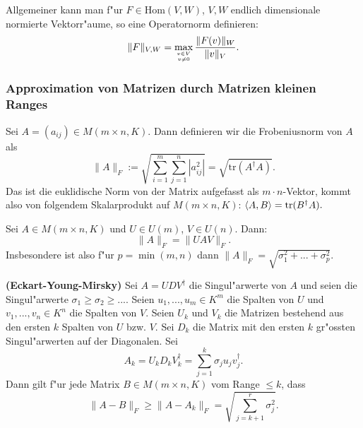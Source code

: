 \documentclass[9pt, a4paper, twocolumn, landscape]{article}
\begin{document}
\begin{remark}
Allgemeiner kann man f"ur $F \in \mathrm{Hom}(V, W)$, $V, W$ endlich dimensionale normierte Vektorr"aume, so eine Operatornorm definieren:
$$
\|F\|_{V, W} = \max\limits_{ v \in V \atop v \neq 0} \frac{\|F(v)\|_W}{\|v\|_V}.
$$
\end{remark}



\subsubsection{Approximation von Matrizen durch Matrizen kleinen Ranges}
\begin{definition}
Sei $A = (a_{ij}) \in M( m \times n, K)$. Dann definieren wir die Frobeniusnorm von $A$ als
$$
\|A\|_F := \sqrt{\sum\limits_{i = 1}^m \sum\limits_{j = 1}^n |a_{ij}^2|} = \sqrt{\mathrm{tr}(A^\dagger A)}.
$$
Das ist die euklidische Norm von der Matrix aufgefasst als $m \cdot n$-Vektor, kommt also von folgendem Skalarprodukt auf $M(m \times n, K)$:
$
\left\langle {A} , {B} \right\rangle = \mathrm{tr}(B^\dagger A).
$
\end{definition}



\begin{lemma}
Sei $A \in M( m \times n, K)$ und $U \in U(m)$, $V \in U(n)$. Dann:
$$
\| A \|_F = \|UAV\|_F.
$$
Insbesondere ist also f"ur $p = \min(m, n)$ dann
$
\|A\|_F =  \sqrt{\sigma_1^2 + ... + \sigma_p^2}.
$
\end{lemma}

\begin{theorem} \textbf{(Eckart-Young-Mirsky)} Sei $A = UDV^\dagger$ die Singul"arwerte von $A$ und seien die Singul"arwerte $\sigma_1 \geq  \sigma_2 \geq...$. Seien $u_1, ..., u_m \in K^m$ die Spalten von $U$ und $v_1, ..., v_n \in K^n$ die Spalten von $V$. Seien $U_k$ und $V_k$ die Matrizen bestehend aus den ersten $k$ Spalten von $U$ bzw. $V$. Sei $D_k$ die Matrix mit den ersten $k$ gr"ossten Singul"arwerten auf der Diagonalen. Sei 
$$
A_k = U_k D_k V_k^\dagger = \sum\limits_{j = 1}^k \sigma_j u_j v_j^\dagger.
$$
Dann gilt f"ur jede Matrix $B \in M( m \times n, K)$ vom Range $\leq k$, dass
$$
\|A - B\|_F \geq \|A - A_k \|_F = \sqrt{\sum\limits_{j = k+1}^r \sigma_j^2}.
$$
\end{theorem}
\end{document}
